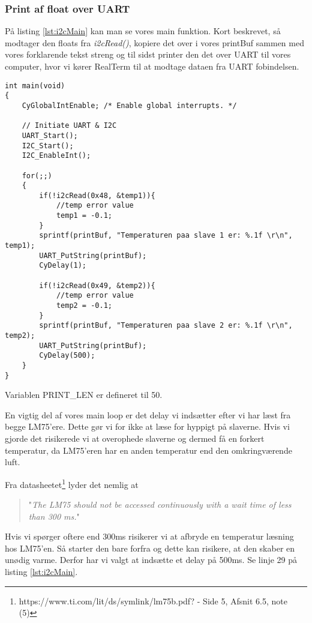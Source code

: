 \documentclass[../main.tex]{subfiles}
\begin{document}
\subsubsection{Print af float over UART}

På listing \ref{lst:i2cMain} kan man se vores main funktion. Kort beskrevet, så modtager den floats fra \textit{i2cRead()}, kopiere det over i vores printBuf sammen med vores forklarende tekst streng
 og til sidst printer den det over UART til vores computer, hvor vi kører RealTerm til at modtage dataen fra UART fobindelsen.

\begin{lstlisting}[caption={main()}, label=lst:i2cMain]
int main(void)
{
    CyGlobalIntEnable; /* Enable global interrupts. */
    
    // Initiate UART & I2C
    UART_Start();
    I2C_Start();
    I2C_EnableInt();
    
    for(;;)
    {
        if(!i2cRead(0x48, &temp1)){
            //temp error value
            temp1 = -0.1;
        }
        sprintf(printBuf, "Temperaturen paa slave 1 er: %.1f \r\n", temp1);
        UART_PutString(printBuf);
        CyDelay(1);
        
        if(!i2cRead(0x49, &temp2)){
            //temp error value
            temp2 = -0.1;
        }
        sprintf(printBuf, "Temperaturen paa slave 2 er: %.1f \r\n", temp2);
        UART_PutString(printBuf);
        CyDelay(500);
    }
}
\end{lstlisting}
Variablen PRINT\_LEN er defineret til 50.

En vigtig del af vores main loop er det delay vi indsætter efter vi har læst fra begge LM75'ere. Dette gør vi for ikke at læse for hyppigt på slaverne. 
Hvis vi gjorde det risikerede vi at overophede slaverne og dermed få en forkert temperatur, da LM75'eren har en anden temperatur end den omkringværende luft. 

Fra datasheetet\footnote{https://www.ti.com/lit/ds/symlink/lm75b.pdf? - Side 5, Afsnit 6.5, note (5)} lyder det nemlig at
\begin{quote}
    "\textit{The LM75 should not be accessed continuously with a
wait time of less than 300 ms.}"
\end{quote}
Hvis vi spørger oftere end 300ms risikerer vi at afbryde en temperatur læsning hos LM75'en. Så starter den bare forfra og dette kan risikere, at den skaber en unødig varme.
Derfor har vi valgt at indsætte et delay på 500ms. Se linje 29 på listing \ref{lst:i2cMain}.
\end{document}
